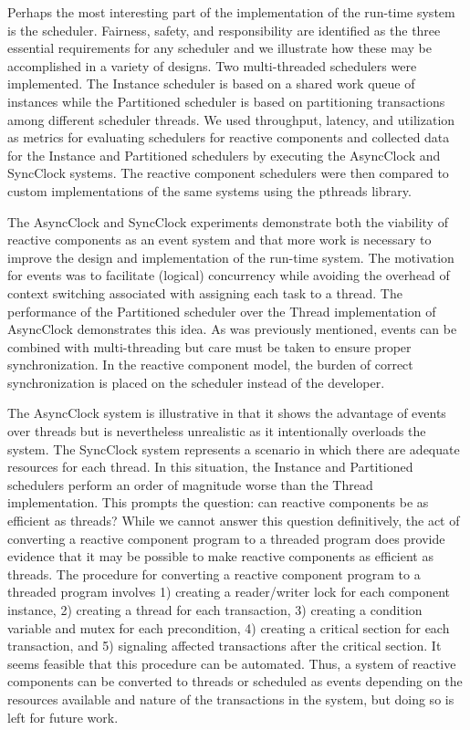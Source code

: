 Perhaps the most interesting part of the implementation of the \rcgo{} run-time system is the scheduler.
Fairness, safety, and responsibility are identified as the three essential requirements for any scheduler and we illustrate how these may be accomplished in a variety of designs.
Two multi-threaded schedulers were implemented.
The Instance scheduler is based on a shared work queue of instances while the Partitioned scheduler is based on partitioning transactions among different scheduler threads.
We used throughput, latency, and utilization as metrics for evaluating schedulers for reactive components and collected data for the Instance and Partitioned schedulers by executing the AsyncClock and SyncClock systems.
The reactive component schedulers were then compared to custom implementations of the same systems using the pthreads library.

The AsyncClock and SyncClock experiments demonstrate both the viability of reactive components as an event system and that more work is necessary to improve the design and implementation of the run-time system.
The motivation for events was to facilitate (logical) concurrency while avoiding the overhead of context switching associated with assigning each task to a thread.
The performance of the Partitioned scheduler over the Thread implementation of AsyncClock demonstrates this idea.
As was previously mentioned, events can be combined with multi-threading but care must be taken to ensure proper synchronization.
In the reactive component model, the burden of correct synchronization is placed on the scheduler instead of the developer.

The AsyncClock system is illustrative in that it shows the advantage of events over threads but is nevertheless unrealistic as it intentionally overloads the system.
The SyncClock system represents a scenario in which there are adequate resources for each thread.
In this situation, the Instance and Partitioned schedulers perform an order of magnitude worse than the Thread implementation.
This prompts the question:  can reactive components be as efficient as threads?
While we cannot answer this question definitively, the act of converting a reactive component program to a threaded program does provide evidence that it may be possible to make reactive components as efficient as threads.
The procedure for converting a reactive component program to a threaded program involves 1) creating a reader/writer lock for each component instance, 2) creating a thread for each transaction, 3) creating a condition variable and mutex for each precondition, 4) creating a critical section for each transaction, and 5) signaling affected transactions after the critical section.
It seems feasible that this procedure can be automated.
Thus, a system of reactive components can be converted to threads or scheduled as events depending on the resources available and nature of the transactions in the system, but doing so is left for future work.

